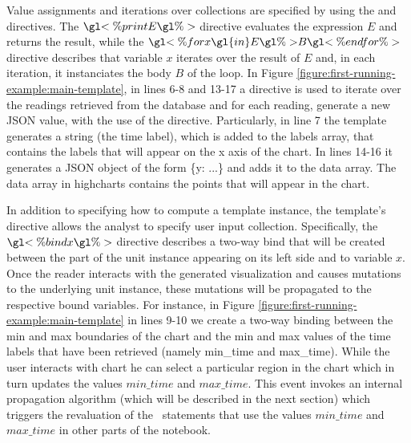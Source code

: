  Value assignments and iterations over collections are specified by using the  and  directives. The $\gl{<\% print } E \gl{ \%>}$ directive evaluates the expression $E$ and returns the result, while the $\gl{<\% for } x \gl{ in } E \gl{ \%> } B \gl{ <\% end for \%>}$ directive describes that variable $x$ iterates over the result of $E$ and, in each iteration, it instanciates the body $B$ of the  loop. In Figure \ref{figure:first-running-example:main-template}, in lines 6-8 and 13-17 a  directive is used to iterate over the readings retrieved from the database and for each reading, generate a new JSON value, with the use of the  directive. Particularly, in line 7 the template generates a string (the time label), which is added to the labels array, that contains the labels that will appear on the x axis of the chart. In lines 14-16 it generates a JSON object of the form \{y: ...\} and adds it to the data array. The data array in highcharts contains the points that will appear in the chart.

 In addition to specifying how to compute a template instance, the template's  directive allows the analyst to specify user input collection. Specifically, the $\gl{<\% bind x} \gl{ \%>}$ directive describes a two-way bind that will be created between the part of the unit instance appearing on its left side and to variable $x$. Once the reader interacts with the generated visualization and causes mutations to the underlying unit instance, these mutations will be propagated to the respective bound variables. For instance, in Figure \ref{figure:first-running-example:main-template} in lines 9-10 we create a two-way binding between the min and max boundaries of the chart and the min and max values of the time labels that have been retrieved (namely min\_time and max\_time). While the user interacts with chart he can select a particular region in the chart which in turn updates the values $min\_time$ and $max\_time$. This event invokes an internal propagation algorithm (which will be described in the next section) which triggers the revaluation of the \projname\ statements that use the values $min\_time$ and $max\_time$ in other parts of the notebook.



